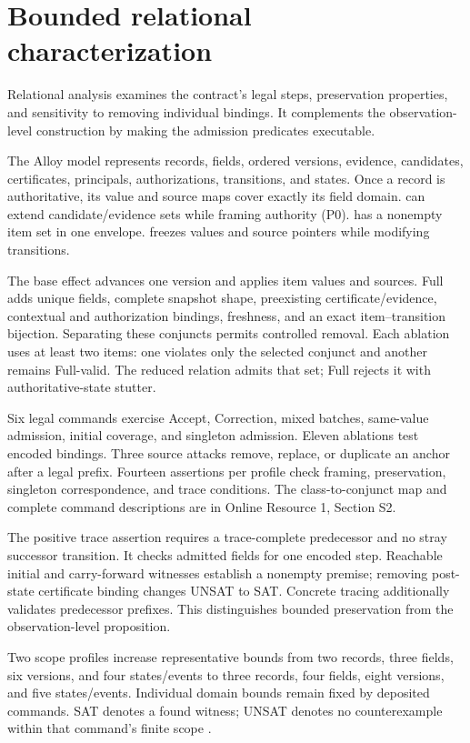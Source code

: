 \section{Bounded relational characterization}
\label{sec:alloy}

Relational analysis examines the contract's legal steps, preservation properties, and sensitivity to removing individual bindings. It complements the observation-level construction by making the admission predicates executable.

The Alloy model represents records, fields, ordered versions, evidence, candidates, certificates, principals, authorizations, transitions, and states. Once a record is authoritative, its value and source maps cover exactly its field domain.  can extend candidate/evidence sets while framing authority (P0).  has a nonempty item set in one envelope.  freezes values and source pointers while modifying transitions.

The base effect advances one version and applies item values and sources. Full adds unique fields, complete snapshot shape, preexisting certificate/evidence, contextual and authorization bindings, freshness, and an exact item--transition bijection. Separating these conjuncts permits controlled removal. Each ablation uses at least two items: one violates only the selected conjunct and another remains Full-valid. The reduced relation admits that set; Full rejects it with authoritative-state stutter.

Six legal commands exercise Accept, Correction, mixed batches, same-value admission, initial coverage, and singleton admission. Eleven ablations test encoded bindings. Three source attacks remove, replace, or duplicate an anchor after a legal prefix. Fourteen assertions per profile check framing, preservation, singleton correspondence, and trace conditions. The class-to-conjunct map and complete command descriptions are in Online Resource 1, Section S2.

The positive trace assertion requires a trace-complete predecessor and no stray successor transition. It checks admitted fields for one encoded step. Reachable initial and carry-forward witnesses establish a nonempty premise; removing post-state certificate binding changes UNSAT to SAT. Concrete tracing additionally validates predecessor prefixes. This distinguishes bounded preservation from the observation-level proposition.

Two scope profiles increase representative bounds from two records, three fields, six versions, and four states/events to three records, four fields, eight versions, and five states/events. Individual domain bounds remain fixed by deposited commands. SAT denotes a found witness; UNSAT denotes no counterexample within that command's finite scope \citep{jackson2002alloy,torlak2007kodkod}.


